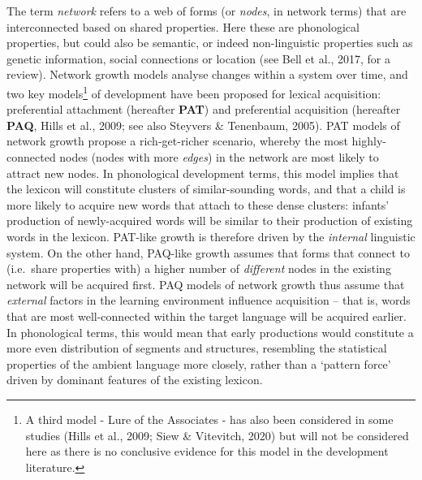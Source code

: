 \documentclass[
  man]{apa6}
\begin{document}
The term \emph{network} refers to a web of forms (or \emph{nodes}, in network terms) that are interconnected based on shared properties. Here these are phonological properties, but could also be semantic, or indeed non-linguistic properties such as genetic information, social connections or location (see Bell et al., 2017, for a review). Network growth models analyse changes within a system over time, and two key models\footnote{A third model - Lure of the Associates - has also been considered in some studies (Hills et al., 2009; Siew \& Vitevitch, 2020) but will not be considered here as there is no conclusive evidence for this model in the development literature.} of development have been proposed for lexical acquisition: preferential attachment (hereafter \textbf{PAT}) and preferential acquisition (hereafter \textbf{PAQ}, Hills et al., 2009; see also Steyvers \& Tenenbaum, 2005). PAT models of network growth propose a rich-get-richer scenario, whereby the most highly-connected nodes (nodes with more \emph{edges}) in the network are most likely to attract new nodes. In phonological development terms, this model implies that the lexicon will constitute clusters of similar-sounding words, and that a child is more likely to acquire new words that attach to these dense clusters: infants' production of newly-acquired words will be similar to their production of existing words in the lexicon. PAT-like growth is therefore driven by the \emph{internal} linguistic system. On the other hand, PAQ-like growth assumes that forms that connect to (i.e.~share properties with) a higher number of \emph{different} nodes in the existing network will be acquired first. PAQ models of network growth thus assume that \emph{external} factors in the learning environment influence acquisition -- that is, words that are most well-connected within the target language will be acquired earlier. In phonological terms, this would mean that early productions would constitute a more even distribution of segments and structures, resembling the statistical properties of the ambient language more closely, rather than a `pattern force' driven by dominant features of the existing lexicon.
\end{document}
